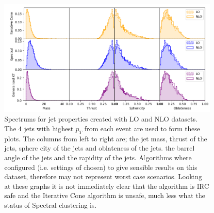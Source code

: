 \begin{figure}[htp]
    \includegraphics[width=\textwidth]{graphics/IRC_singles2}
    \caption{Spectrums for jet properties created with LO and NLO datasets.
             The \(4\) jets with highest \(p_T\) from each event are used to 
             form these plots.
             The columns from left to right are; the jet mass, 
             thrust of the jets, sphere city of the jets and oblateness of the jets.
             the barrel angle of the jets and the rapidity of the jets.
             Algorithms where configured (i.e. settings of \stoppingdeltar{} chosen)
             to give sensible results on
             this dataset, therefore may not represent worst case scenarios.
             Looking at these graphs it is not immediately clear that the \genkt{}
             algorithm is IRC safe and the Iterative Cone algorithm is unsafe, 
         much less what the status of Spectral clustering is.}\label{fig:IRC_singles2}

\end{figure}
